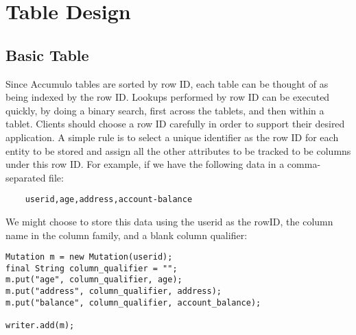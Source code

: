 
%
%

\chapter{Table Design}

\section{Basic Table}

Since Accumulo tables are sorted by row ID, each table can be thought of as being
indexed by the row ID. Lookups performed by row ID can be executed quickly, by doing
a binary search, first across the tablets, and then within a tablet. Clients should
choose a row ID carefully in order to support their desired application. A simple rule
is to select a unique identifier as the row ID for each entity to be stored and assign
all the other attributes to be tracked to be columns under this row ID. For example,
if we have the following data in a comma-separated file:

\begingroup\fontsize{8pt}{8pt}\selectfont\begin{verbatim}
    userid,age,address,account-balance
\end{verbatim}\endgroup

We might choose to store this data using the userid as the rowID, the column
name in the column family, and a blank column qualifier:

\begingroup\fontsize{8pt}{8pt}\selectfont\begin{verbatim}
Mutation m = new Mutation(userid);
final String column_qualifier = "";
m.put("age", column_qualifier, age);
m.put("address", column_qualifier, address);
m.put("balance", column_qualifier, account_balance);

writer.add(m);
\end{verbatim}\endgroup

